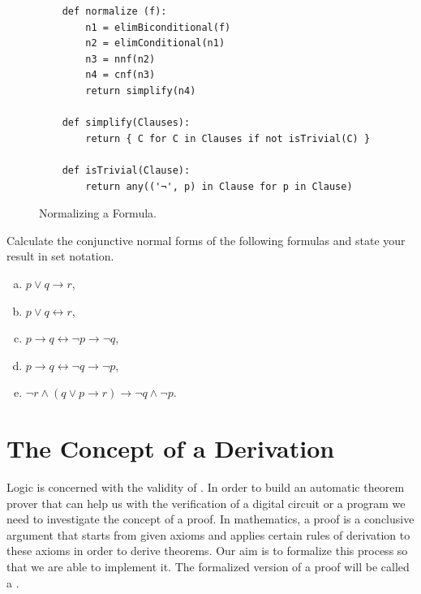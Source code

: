 \begin{figure}[!ht]
  \centering
\begin{verbatim}
    def normalize (f):
        n1 = elimBiconditional(f)
        n2 = elimConditional(n1)
        n3 = nnf(n2)
        n4 = cnf(n3)
        return simplify(n4)
    
    def simplify(Clauses):
        return { C for C in Clauses if not isTrivial(C) }
    
    def isTrivial(Clause):
        return any(('¬', p) in Clause for p in Clause)
\end{verbatim} 
\vspace*{-0.3cm}
  \caption{Normalizing a Formula.}
  \label{fig:normalize}
\end{figure}
\pagebreak

\exerciseEng
Calculate the conjunctive normal forms of the following formulas and state your result in set notation.
\begin{enumerate}[(a)]
\item $p \vee q \rightarrow r$,
\item $p \vee q \leftrightarrow r$,
\item $p \rightarrow q \leftrightarrow \neg p \rightarrow \neg q$,
\item $p \rightarrow q \leftrightarrow \neg q \rightarrow \neg p$,
\item $\neg r \wedge (q \vee p \rightarrow r) \rightarrow \neg q \wedge \neg p$.
\end{enumerate}

\section{The Concept of a Derivation}
Logic is concerned with the validity of . In order to build an automatic theorem prover that can 
help us with the verification of a digital circuit or a program we need to investigate the concept of a proof.
In mathematics, a proof is a conclusive argument that starts from given axioms and applies certain rules of
derivation to these axioms in order to derive theorems.  Our aim is to formalize this process so that we are
able to implement it. The formalized version of a proof will be called a .


